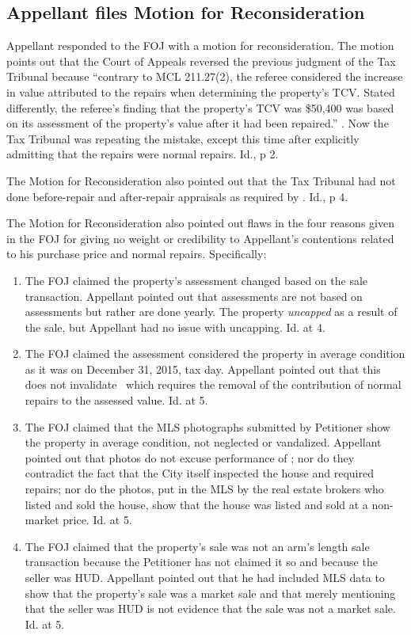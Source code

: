 \documentclass[12pt,\documentclassflag]{michiganCourtOfAppealsBrief}
\begin{document}
\subsection{Appellant files Motion for Reconsideration}

Appellant responded to the FOJ with a motion for reconsideration. The motion points out that the Court of Appeals reversed the previous judgment of the Tax Tribunal because  ``contrary to MCL 211.27(2), the referee considered the increase in value attributed to the repairs when determining the property's TCV. Stated differently, the referee's finding that the property's TCV was \$50,400 was based on its assessment of the property's value after it had been repaired.'' \motionForReconsideration[1]. Now the Tax Tribunal was repeating the mistake, except this time after explicitly admitting that the repairs were normal repairs. Id., p 2. 

The Motion for Reconsideration also pointed out that the Tax Tribunal had not done before-repair and after-repair appraisals as required by \mathieuGast. Id., p 4.

The Motion for Reconsideration also pointed out flaws in the four reasons given in the FOJ for giving no weight or credibility to Appellant's contentions related to his purchase price and normal repairs. Specifically:

\begin{enumerate}
\item The FOJ claimed the property's assessment changed based on the sale transaction. Appellant pointed out that assessments are not based on assessments but rather are done yearly. The property \emph{uncapped} as a result of the sale, but Appellant had no issue with uncapping. Id. at 4.

\item The FOJ claimed the assessment considered the property in average condition as it was on December 31, 2015, tax day. Appellant pointed out that this does not invalidate \mathieuGast\ which requires the removal of the contribution of normal repairs to the assessed value. Id. at 5. 

\item The FOJ claimed that the MLS photographs submitted by Petitioner show the property in average condition, not neglected or vandalized. Appellant pointed out that photos do not excuse performance of \mathieuGast; nor do they contradict the fact that the City itself inspected the house and required repairs; nor do the photos, put in the MLS by the real estate brokers who listed and sold the house, show that the house was listed and sold at a non-market price. Id. at 5.
  
\item The FOJ claimed that the property's sale was not an arm's length sale transaction because the Petitioner has not claimed it so and because the seller was HUD. Appellant pointed out that he had included MLS data to show that the property's sale was a market sale and that merely mentioning that the seller was HUD is not evidence that the sale was not a market sale. Id. at 5.
\end{enumerate}
\end{document}
